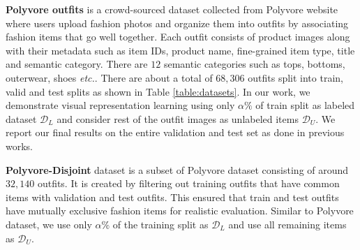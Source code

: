 \documentclass[sigconf]{acmart}
\newcommand{\etc}{\textit{etc.}}
\begin{document}
\vspace{2mm}
\noindent \textbf{Polyvore outfits} is a crowd-sourced dataset collected from Polyvore website where users upload fashion photos and organize them into outfits by associating fashion items that go well together. Each outfit consists of product images along with their metadata such as item IDs, product name, fine-grained item type, title and semantic category. There are $12$ semantic categories such as tops, bottoms, outerwear, shoes \etc. There are about a total of $68{,}306$ outfits split into train, valid and test splits as shown in Table \ref{table:datasets}. 
In our work, we demonstrate visual representation learning using only $\alpha\%$ of train split as labeled dataset $\mathcal{D}_L$ and consider rest of the outfit images as unlabeled items $\mathcal{D}_U$. We report our final results on the entire validation and test set as done in previous works.

\vspace{2mm}
\noindent \textbf{Polyvore-Disjoint} dataset is a subset of Polyvore dataset consisting of around $32{,}140$ outfits. It is created by filtering out training outfits that have common items with validation and test outfits. This ensured that train and test outfits have mutually exclusive fashion items for realistic evaluation. Similar to Polyvore dataset, we use only $\alpha\%$ of the training split as $\mathcal{D}_L$ and use all remaining items as $\mathcal{D}_U$. 

\begin{comment}
\begin{table}[t]
    \centering
    \caption{Statistics of Polyvore, Polyvore-D and newly created fashion dataset in terms of number of outfits in train, validation and test splits. We also mention overall fashion items in these datasets. Our dataset has $\sim$10 times more outfits than existing datasets.}
    \vspace{1.5mm}
    \setlength{\tabcolsep}{5pt}
\begin{tabular}{l|cccc}
    \hline
        Dataset & Train & Validation & Test & \#items \\
        \hline
        Polyvore & $~53K$ & $10K$ & $~5K$ & $~365K$ \\
        Polyvore-D & $~17K$ & - & $~15K$ & $~175K$ \\
        Fashion Outfits & $~675K$ & $10K$ & $~20K$ & $~3M$ \\
        \hline
    \end{tabular}
\vspace{-3mm}
    \label{table:datasets}
\end{table}
\end{comment}
\end{document}
